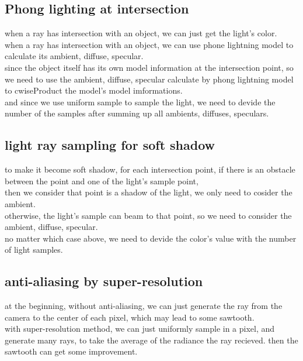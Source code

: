 \documentclass[acmtog]{acmart}
\begin{document}
\subsection{Phong lighting at intersection}
when a ray has intersection with an object, we can just get the light's color.\\
when a ray has intersection with an object, we can use phone lightning model to calculate its ambient, diffuse, specular.\\
since the object itself has its own model information at the intersection point,
so we need to use the ambient, diffuse, specular calculate by phong lightning model to cwiseProduct the model's model imformations.\\
and since we use uniform sample to sample the light, we need to devide the number of the samples after summing up all ambients, diffuses, speculars.

\subsection{light ray sampling for soft shadow}
to make it become soft shadow, for each intersection point, if there is an obstacle between the point and one of the light's sample point,\\
then we consider that point is a shadow of the light, we only need to cosider the ambient.\\
otherwise, the light's sample can beam to that point, so we need to consider the ambient, diffuse, specular.\\
no matter which case above, we need to devide the color's value with the number of light samples.

\subsection{anti-aliasing by super-resolution}
at the beginning, without anti-aliasing, we can just generate the ray from the camera to the center of each pixel,
which may lead to some sawtooth.\\
with super-resolution method, we can just uniformly sample in a pixel,
and generate many rays, to take the average of the radiance the ray recieved.
then the sawtooth can get some improvement.
\end{document}
